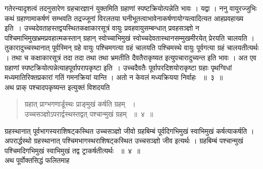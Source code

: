 \documentclass[11pt, openany]{book}
\begin{document}
\begin{sloppypar}

गतेरन्यादृशत्वं तदनुसारेण ग्रहचारज्ञानं युक्तमिति ग्रहाणां स्पष्टक्रियोत्पन्नेति भावः । यद्वा । ननु वायुरज्जुभिः कथं ग्रहाणामाकर्षणं सम्भवति तद्रज्जूनां विरलतया घनीभूतत्वाभावेनाकर्षणायोग्यत्वादित्यत आह\textendash  प्रवहाख्य इति~। उच्चदेवताहस्तद्वयस्थितकक्षाकारसूत्रं वायुः प्रवहवायुसम्बन्धात् प्रवहसञ्ज्ञो न पश्चिमाभिमुखभ्रमप्रवहात्मकस्तान् ग्रहान् स्वोच्चाभिमुखं स्वोच्चदेवतास्थानसम्मुखमीरयेत् प्रेरयति चालयति । तुकारादुच्चस्थानात् पूर्वस्मिन् ग्रहे वायुः पश्चिमगत्या ग्रहं चालयति पश्चिमस्थे वायुः पूर्वगत्या ग्रहं चालयतीत्यर्थः । तथा च कक्षाकारसूत्रं तदा तदा तथा तथा भ्रमतीति दैवतैराकृष्यत इत्युपचारादुच्यन्त इति भावः । अत एव ग्रहाणां स्पष्टक्रियोत्पन्नेत्याह\textendash  पूर्वापरापकृष्टा इति~। उच्चदैवतैः पूर्वापरदिशयोराकृष्टा ग्रहाः पृथग्विधां मध्यमातिरिक्तप्रकारां गतिं गमनक्रियां यान्ति । अतो न केवलं मध्यक्रियया निर्वाहः ~॥~३~॥\\ 
\noindent अथ प्राक् पश्चादपकृष्यन्त इत्युक्तं विशदयति\textendash
\end{sloppypar}
\begin{quote}

{\ssi ग्रहात् प्राग्भगणार्डूस्थः प्राङ्मुखं कर्षति ग्रहम् ~।\\
उच्चसञ्ज्ञोऽपरार्द्वस्थस्तद्वत् पश्चान्मुखं ग्रहम् ~॥~४~॥}
\end{quote}
\begin{sloppypar}
ग्रहस्थानात् पूर्वभागस्यराशिषट्कस्थित उच्चसञ्ज्ञो जीवो ग्रहबिम्बं पूर्वदिगभिमुखं स्वाभिमुखं कर्षत्याकर्षति । अपरार्द्धस्थो ग्रहस्थानात् पश्चिमभागस्थराशिषट्कस्थित उच्चसञ्ज्ञो जीव इत्यर्थः । ग्रहबिम्बं पश्चान्मुखं पश्चिमदिगभिमुखं स्वाभिमुखं तद्व
ट्राकर्षतीत्यर्थः ~॥~४~॥\\ 
\noindent अथ पूर्वोक्तसिद्धं फलितमाह\textendash
\end{sloppypar}

\newpage
\end{document}

